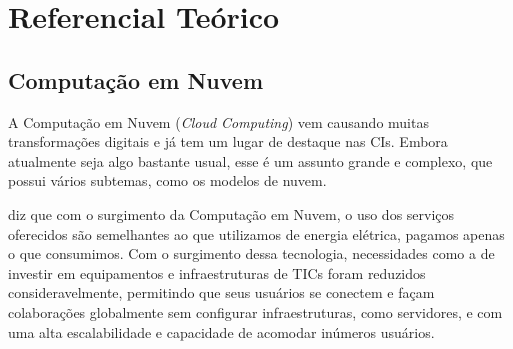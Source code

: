 %
%

\chapter{Referencial Teórico}\label{chap:Referencial Teórico}  

\section{Computação em Nuvem}
A Computação em Nuvem (\textit{Cloud Computing}) vem causando muitas transformações digitais e já tem um lugar de destaque nas CIs. Embora atualmente seja algo bastante usual, esse é um assunto grande e complexo, que possui vários subtemas, como os modelos de nuvem.

 diz que com o surgimento da Computação em Nuvem, o uso dos serviços oferecidos são semelhantes ao que utilizamos de energia elétrica, pagamos apenas o que consumimos. Com o surgimento dessa tecnologia, necessidades como a de investir em equipamentos e infraestruturas de TICs foram reduzidos consideravelmente, permitindo que seus usuários se conectem e façam colaborações globalmente sem configurar
infraestruturas, como servidores, e com uma alta escalabilidade e capacidade de acomodar inúmeros usuários. 

